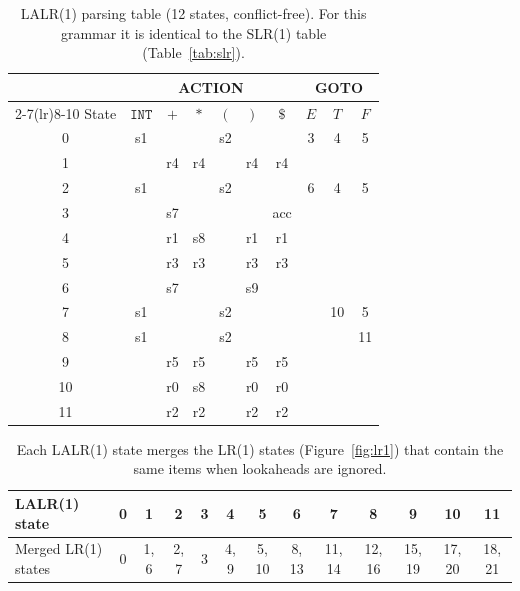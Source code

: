 \documentclass{article}
\newcommand{\tINT}{\mathtt{INT}}
\begin{document}
\begin{table}[H]
\centering
\begin{tabular}{c cccccc ccc}
\toprule
& \multicolumn{6}{c}{ACTION} & \multicolumn{3}{c}{GOTO} \\
\cmidrule(lr){2-7}\cmidrule(lr){8-10}
State & $\tINT$ & $+$ & $*$ & $($ & $)$ & $\$$ & $E$ & $T$ & $F$ \\
\midrule
0 & s1 &  &  & s2 &  &  & 3 & 4 & 5 \\
1 &  & r4 & r4 &  & r4 & r4 &  &  &  \\
2 & s1 &  &  & s2 &  &  & 6 & 4 & 5 \\
3 &  & s7 &  &  &  & acc &  &  &  \\
4 &  & r1 & s8 &  & r1 & r1 &  &  &  \\
5 &  & r3 & r3 &  & r3 & r3 &  &  &  \\
6 &  & s7 &  &  & s9 &  &  &  &  \\
7 & s1 &  &  & s2 &  &  &  & 10 & 5 \\
8 & s1 &  &  & s2 &  &  &  &  & 11 \\
9 &  & r5 & r5 &  & r5 & r5 &  &  &  \\
10 &  & r0 & s8 &  & r0 & r0 &  &  &  \\
11 &  & r2 & r2 &  & r2 & r2 &  &  &  \\
\bottomrule
\end{tabular}
\caption{LALR(1) parsing table (12 states, conflict-free).
  For this grammar it is identical to the SLR(1) table (Table~\ref{tab:slr}).}
\label{tab:lalr}
\end{table}

\begin{table}[H]
\centering
\setlength{\tabcolsep}{4pt}
\begin{tabular}{l *{12}{c}}
\toprule
LALR(1) state & 0 & 1 & 2 & 3 & 4 & 5 & 6 & 7 & 8 & 9 & 10 & 11 \\
\midrule
Merged LR(1) states & 0 & 1, 6 & 2, 7 & 3 & 4, 9 & 5, 10 & 8, 13 & 11, 14 & 12, 16 & 15, 19 & 17, 20 & 18, 21 \\
\bottomrule
\end{tabular}
\caption{Each LALR(1) state merges the LR(1) states (Figure~\ref{fig:lr1}) that contain
  the same items when lookaheads are ignored.}
\label{tab:merge}
\end{table}
\end{document}
